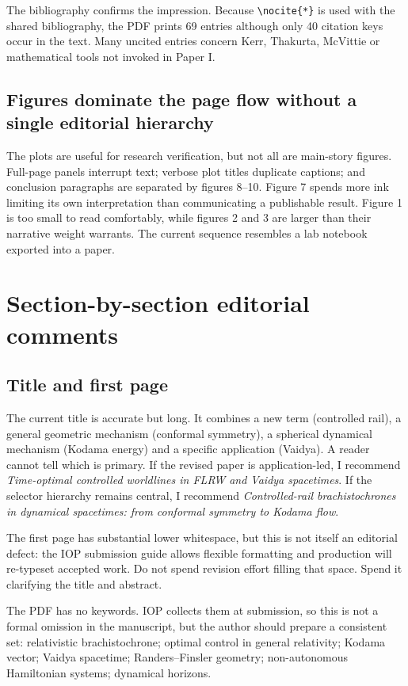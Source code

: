 \documentclass[11pt,a4paper]{article}
\begin{document}
The bibliography confirms the impression.  Because \verb|\nocite{*}| is used with the shared
bibliography, the PDF prints 69 entries although only 40 citation keys occur in the text.  Many
uncited entries concern Kerr, Thakurta, McVittie or mathematical tools not invoked in Paper I.

\subsection{Figures dominate the page flow without a single editorial hierarchy}

The plots are useful for research verification, but not all are main-story figures.  Full-page
panels interrupt text; verbose plot titles duplicate captions; and conclusion paragraphs are
separated by figures 8--10.  Figure 7 spends more ink limiting its own interpretation than
communicating a publishable result.  Figure 1 is too small to read comfortably, while figures 2
and 3 are larger than their narrative weight warrants.  The current sequence resembles a lab
notebook exported into a paper.

\section{Section-by-section editorial comments}

\subsection{Title and first page}

The current title is accurate but long.  It combines a new term (controlled rail), a general
geometric mechanism (conformal symmetry), a spherical dynamical mechanism (Kodama energy) and a
specific application (Vaidya).  A reader cannot tell which is primary.  If the revised paper is
application-led, I recommend \emph{Time-optimal controlled worldlines in FLRW and Vaidya
spacetimes}.  If the selector hierarchy remains central, I recommend \emph{Controlled-rail
brachistochrones in dynamical spacetimes: from conformal symmetry to Kodama flow}.

The first page has substantial lower whitespace, but this is not itself an editorial defect: the
IOP submission guide allows flexible formatting and production will re-typeset accepted work.
Do not spend revision effort filling that space.  Spend it clarifying the title and abstract.

The PDF has no keywords.  IOP collects them at submission, so this is not a formal omission in the
manuscript, but the author should prepare a consistent set: relativistic brachistochrone; optimal
control in general relativity; Kodama vector; Vaidya spacetime; Randers--Finsler geometry;
non-autonomous Hamiltonian systems; dynamical horizons.
\end{document}
